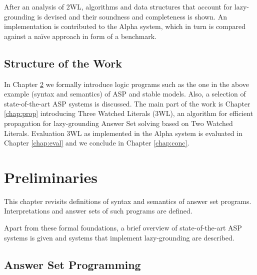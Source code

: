 \documentclass{vutinfth} %
\begin{document}


After an analysis of 2WL, algorithms and data structures that account for lazy-grounding is devised and their soundness and completeness is shown. An implementation is contributed to the Alpha system, which in turn is compared against a na{\"i}ve approach in form of a benchmark.

\section{Structure of the Work}

In Chapter \ref{chap:prelim} we formally introduce logic programs such as the one in the above example (syntax and semantics) of ASP and stable models. Also, a selection of state-of-the-art ASP systems is discussed. The main part of the work is Chapter \ref{chap:prop} introducing Three Watched Literals (3WL), an algorithm for efficient propagation for lazy-grounding Answer Set solving based on Two Watched Literals. Evaluation 3WL as implemented in the Alpha system is evaluated in Chapter \ref{chap:eval} and we conclude in Chapter \ref{chap:conc}.

\chapter{Preliminaries}
\label{chap:prelim}

This chapter revisits definitions of syntax and semantics of answer set programs. Interpretations and answer sets of such programs are defined.

Apart from these formal foundations, a brief overview of state-of-the-art ASP systems is given and systems that implement lazy-grounding are described.

\section{Answer Set Programming}
\end{document}
